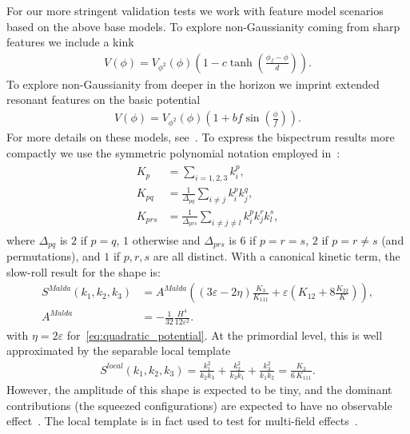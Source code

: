 \documentclass[a4paper,12pt]{extarticle}
\newcommand{\quadpot}{V_{\phi^2}(\phi)}
\begin{document}
For our more stringent validation tests we work with feature model scenarios
based on the above base models.
To explore non-Gaussianity coming from sharp features we include
a kink
\begin{align}\label{eq:kink_potential}
    V(\phi) = \quadpot\left(1-c\tanh\left(\frac{\phi_f-\phi}{d}\right)\right).
\end{align}
To explore non-Gaussianity from deeper in the horizon we imprint
extended resonant features on the basic potential
\begin{align}\label{eq:resonant_potential}
    V(\phi) = \quadpot\left(1+bf\sin\left(\frac{\phi}{f}\right)\right).
\end{align}
For more details on these models, see~\cite{chen_easther_lim_2}.
To express the bispectrum results more compactly we use the symmetric polynomial notation employed in~\cite{FergShell_2}:
\begin{align}\label{shape_notation}
\begin{split}
    K_p &= \sum_{i=1,2,3} k_i^p, \\
    K_{pq} &= \frac{1}{\Delta_{pq}}\sum_{i\neq j} k_i^p k_j^q,   \\
    K_{prs} &= \frac{1}{\Delta_{prs}}\sum_{i\neq j\neq l} k_i^p k_j^r k_l^s,
\end{split}
\end{align}
where $\Delta_{pq}$ is $2$ if $p=q$, $1$ otherwise
and $\Delta_{prs}$ is $6$ if $p=r=s$, $2$ if $p=r\neq s$ (and permutations),
and $1$ if $p,r,s$ are all distinct.
With a canonical kinetic term, the slow-roll result for the shape is:
\begin{align}\label{malda_shape}
    S^{Malda}(k_1,k_2,k_3) &= A^{Malda} \left( (3\varepsilon-2\eta)\frac{K_3}{K_{111}}+\varepsilon \left(K_{12}+8\frac{K_{22}}{K}\right) \right),\\
    A^{Malda} &= -\frac{1}{32}\frac{H^4}{12\varepsilon^2}.
\end{align}
with $\eta=2\varepsilon$ for~\eqref{eq:quadratic_potential}.
At the primordial level, this is well approximated by the separable local template
\begin{align}\label{local_shape}
S^{local}(k_1,k_2,k_3) = \frac{k_1^2}{k_2k_3}+\frac{k_2^2}{k_3k_1}+\frac{k_3^2}{k_1k_2} = \frac{K_3}{6\,K_{111}}.
\end{align}
However, the amplitude of this shape is expected to be tiny,
and the dominant contributions (the squeezed configurations) are expected
to have no observable effect~\cite{Cabass_2016}.
The local template is in fact used to test for multi-field effects~\cite{Planck_NG_2015}.
\end{document}
